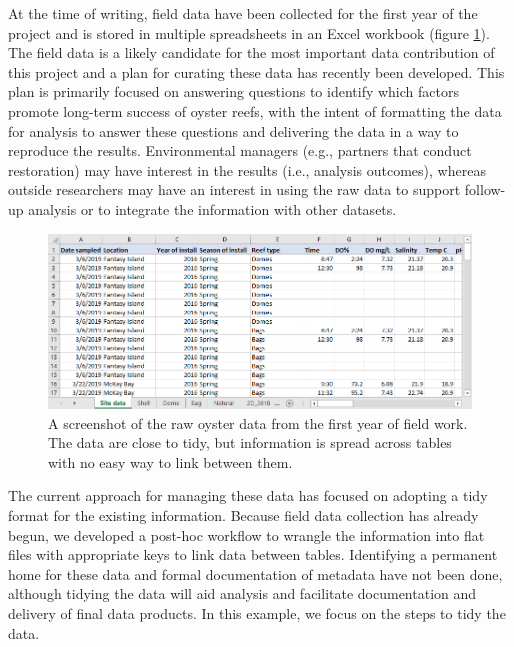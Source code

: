 \documentclass[
]{book}
\begin{document}
At the time of writing, field data have been collected for the first year of the project and is stored in multiple spreadsheets in an Excel workbook (figure \ref{fig:oysexc}). The field data is a likely candidate for the most important data contribution of this project and a plan for curating these data has recently been developed. This plan is primarily focused on answering questions to identify which factors promote long-term success of oyster reefs, with the intent of formatting the data for analysis to answer these questions and delivering the data in a way to reproduce the results. Environmental managers (e.g., partners that conduct restoration) may have interest in the results (i.e., analysis outcomes), whereas outside researchers may have an interest in using the raw data to support follow-up analysis or to integrate the information with other datasets.

\begin{figure}

{\centering \includegraphics[width=1\linewidth]{img/oysterexcel} 

}

\caption{A screenshot of the raw oyster data from the first year of field work.  The data are close to tidy, but information is spread across tables with no easy way to link between them.}\label{fig:oysexc}
\end{figure}

The current approach for managing these data has focused on adopting a tidy format for the existing information. Because field data collection has already begun, we developed a post-hoc workflow to wrangle the information into flat files with appropriate keys to link data between tables. Identifying a permanent home for these data and formal documentation of metadata have not been done, although tidying the data will aid analysis and facilitate documentation and delivery of final data products. In this example, we focus on the steps to tidy the data.
\end{document}
